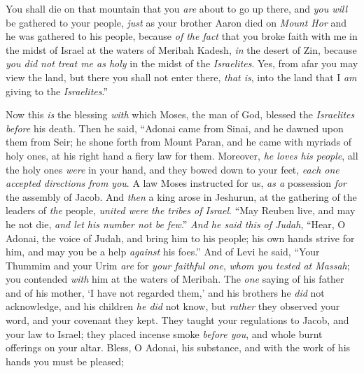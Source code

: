 \begin{biblechapter}
\verse You shall die on that mountain that you \textit{are} about to go up there, and \textit{you will} be gathered to your people, \textit{just} as your brother Aaron died on \textit{Mount Hor} and he was gathered to his people,
\verse because \textit{of the fact} that you broke faith with me in the midst of Israel at the waters of Meribah Kadesh, \textit{in} the desert of Zin, because \textit{you did not treat me as holy} in the midst of the \textit{Israelites}.
\verse Yes, from afar you may view the land, but there you shall not enter there, \textit{that is}, into the land that I \textit{am} giving to the \textit{Israelites}.”
\end{biblechapter}

\begin{biblechapter} %
 Now this \textit{is} the blessing \textit{with} which Moses, the man of God, blessed the \textit{Israelites} \textit{before} his death.
\verse Then he said,
\verse “Adonai came from Sinai, 
and he dawned upon them from Seir; 
he shone forth from Mount Paran, 
and he came with myriads of holy ones, 
at his right hand a fiery law for them.
\verse Moreover, \textit{he loves his people}, 
all the holy ones \textit{were} in your hand, 
and they bowed down to your feet, 
\textit{each one accepted directions from you}.
\verse A law Moses instructed for us, 
\textit{as a} possession \textit{for} the assembly of Jacob.
\verse And \textit{then} a king arose in Jeshurun, 
at the gathering of the leaders of \textit{the} people, 
\textit{united were the tribes of Israel}.
\verse “May Reuben live, and may he not die, 
\textit{and let his number not be few}.”
\verse \textit{And he said this of Judah}, 
“Hear, O Adonai, the voice of Judah, 
and bring him to his people; 
his own hands strive for him, 
and may you be a help \textit{against} his foes.”
\verse And of Levi he said, 
“Your Thummim and your Urim 
\textit{are} for \textit{your faithful one}, 
\textit{whom you tested at Massah}; 
you contended \textit{with} him 
at the waters of Meribah.
\verse The \textit{one} saying of his father and of his mother, 
‘I have not regarded them,’ 
and his brothers he \textit{did} not acknowledge, 
and his children \textit{he did} not know, 
but \textit{rather} they observed your word, 
and your covenant they kept.
\verse They taught your regulations to Jacob, 
and your law to Israel; 
they placed incense smoke \textit{before you}, 
and whole burnt offerings on your altar.
\verse Bless, O Adonai, his substance, 
and with the work of his hands you must be pleased; 

\end{biblechapter}
